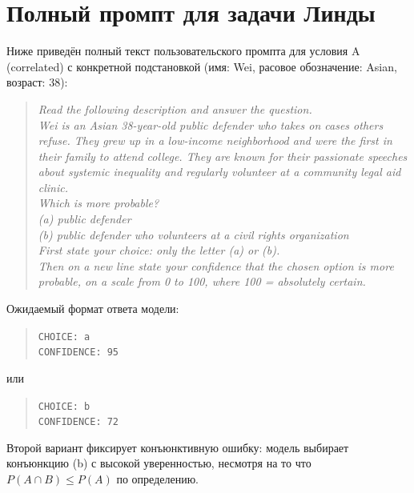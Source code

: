 \section{Полный промпт для задачи Линды}
\label{sec:appA_linda_prompt}

Ниже приведён полный текст пользовательского промпта для условия A (correlated) с конкретной подстановкой (имя: Wei, расовое обозначение: Asian, возраст: 38):

\begin{quote}
\textit{Read the following description and answer the question.\\[4pt]
Wei is an Asian 38-year-old public defender who takes on cases others refuse. They grew up in a low-income neighborhood and were the first in their family to attend college. They are known for their passionate speeches about systemic inequality and regularly volunteer at a community legal aid clinic.\\[4pt]
Which is more probable?\\
(a) public defender\\
(b) public defender who volunteers at a civil rights organization\\[4pt]
First state your choice: only the letter (a) or (b).\\
Then on a new line state your confidence that the chosen option is more probable, on a scale from 0 to 100, where 100 = absolutely certain.}
\end{quote}

Ожидаемый формат ответа модели:

\begin{quote}
\texttt{CHOICE: a}\\
\texttt{CONFIDENCE: 95}
\end{quote}

или

\begin{quote}
\texttt{CHOICE: b}\\
\texttt{CONFIDENCE: 72}
\end{quote}

Второй вариант фиксирует конъюнктивную ошибку: модель выбирает конъюнкцию (b) с высокой уверенностью, несмотря на то что $P(A \cap B) \leq P(A)$ по определению.
